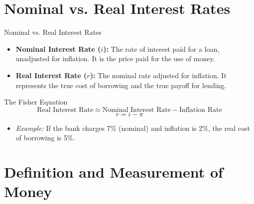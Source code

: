 \documentclass[aspectratio=169]{beamer}
\begin{document}
\section{Nominal vs. Real Interest Rates}

\begin{frame}{Nominal vs. Real Interest Rates}
    \begin{itemize}
        \item \textbf{Nominal Interest Rate ($i$):} The rate of interest paid for a loan, unadjusted for inflation. It is the price paid for the use of money.
        \item \textbf{Real Interest Rate ($r$):} The nominal rate adjusted for inflation. It represents the true cost of borrowing and the true payoff for lending.
    \end{itemize}

    \begin{block}{The Fisher Equation}
        \[ \text{Real Interest Rate} \approx \text{Nominal Interest Rate} - \text{Inflation Rate} \]
        \[ r = i - \pi \]
    \end{block}
    
    \begin{itemize}
        \item \textit{Example:} If the bank charges 7\% (nominal) and inflation is 2\%, the real cost of borrowing is 5\%.
    \end{itemize}
\end{frame}

\section{Definition and Measurement of Money}
\end{document}
